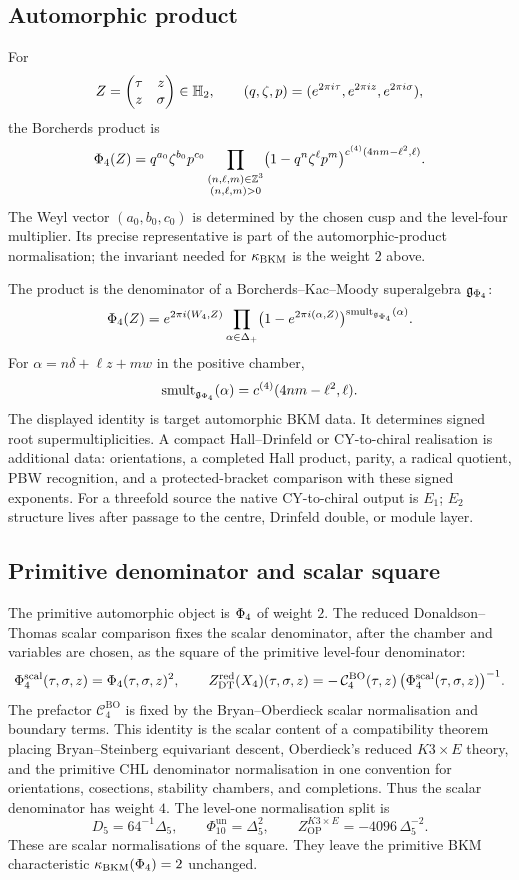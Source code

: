 \subsection*{Automorphic product}

For
\[
  Z=\begin{pmatrix}\tau&z\\ z&\sigma\end{pmatrix}\in\mathbb H_2,
  \qquad
  (q,\zeta,p)=(e^{2\pi i\tau},e^{2\pi iz},e^{2\pi i\sigma}),
\]
the Borcherds product is
\[
  \Phi_4(Z)
  =
  q^{a_0}\zeta^{b_0}p^{c_0}
  \prod_{\substack{(n,\ell,m)\in\mathbb{Z}^3\\(n,\ell,m)>0}}
  \bigl(1-q^n\zeta^\ell p^m\bigr)^{c^{(4)}(4nm-\ell^2,\ell)} .
\]
The Weyl vector $(a_0,b_0,c_0)$ is determined by the chosen cusp and
the level-four multiplier. Its precise representative is part of the
automorphic-product normalisation; the invariant needed for
$\kappa_{\mathrm{BKM}}$ is the weight $2$ above.

The product is the denominator of a Borcherds--Kac--Moody superalgebra
$\mathfrak{g}_{\Phi_4}$:
\[
  \Phi_4(Z)
  =
  e^{2\pi i(W_4,Z)}
  \prod_{\alpha\in\Delta_+}
  \bigl(1-e^{2\pi i(\alpha,Z)}\bigr)^{
    \operatorname{smult}_{\mathfrak{g}_{\Phi_4}}(\alpha)}.
\]
For $\alpha=n\delta+\ell z+mw$ in the positive chamber,
\[
  \operatorname{smult}_{\mathfrak{g}_{\Phi_4}}(\alpha)
  =
  c^{(4)}(4nm-\ell^2,\ell).
\]
The displayed identity is target automorphic BKM data. It determines
signed root supermultiplicities. A compact Hall--Drinfeld or
CY-to-chiral realisation is additional data: orientations, a completed
Hall product, parity, a radical quotient, PBW recognition, and a
protected-bracket comparison with these signed exponents. For a
threefold source the native CY-to-chiral output is $E_1$; $E_2$
structure lives after passage to the centre, Drinfeld double, or module
layer.

\subsection*{Primitive denominator and scalar square}

The primitive automorphic object is $\Phi_4$ of weight $2$. The
reduced Donaldson--Thomas scalar comparison fixes the scalar
denominator, after the chamber and variables are chosen, as the square
of the primitive level-four denominator:
\[
  \Phi^{\mathrm{scal}}_4(\tau,\sigma,z)=\Phi_4(\tau,\sigma,z)^2,
  \qquad
  Z^{\mathrm{red}}_{\mathrm{DT}}(X_4)(\tau,\sigma,z)
  =
  -\,\mathcal C^{\mathrm{BO}}_4(\tau,z)\,
  \bigl(\Phi^{\mathrm{scal}}_4(\tau,\sigma,z)\bigr)^{-1}.
\]
The prefactor $\mathcal C^{\mathrm{BO}}_4$ is fixed by the
Bryan--Oberdieck scalar normalisation and boundary terms. This identity
is the scalar content of a compatibility theorem placing Bryan--Steinberg
equivariant descent, Oberdieck's reduced $K3\times E$ theory, and the
primitive CHL denominator normalisation in one convention for
orientations, cosections, stability chambers, and completions. Thus the
scalar denominator has weight $4$.
The level-one normalisation split is
\[
  D_5=64^{-1}\Delta_5,\qquad
  \Phi_{10}^{\mathrm{un}}=\Delta_5^2,\qquad
  Z^{K3\times E}_{\mathrm{OP}}=-4096\,\Delta_5^{-2}.
\]
These are scalar normalisations of the square. They leave the primitive
BKM characteristic $\kappa_{\mathrm{BKM}}(\Phi_4)=2$ unchanged.

